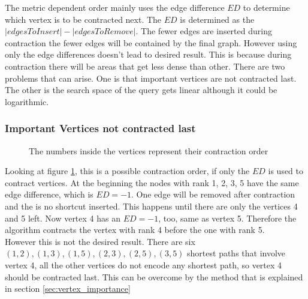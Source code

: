 \documentclass[11pt, rgb]{scrreprt}
\begin{document}
The metric dependent order mainly uses the edge difference $ED$ to determine which vertex is to be contracted next. The $ED$ is determined as the $|edges To Insert| - |edges To Remove|$. The fewer edges are inserted during contraction the fewer edges will be contained by the final graph. However using only the edge differences doesn't lead to desired result. This is because during contraction there will be areas that get less dense than other. There are two problems that can arise. One is that important vertices are not contracted last. The other is the search space of the query gets linear although it could be logarithmic.

\subsubsection{Important Vertices not contracted last}\label{sec:not_contracted_last}

\begin{figure}
    \centering
{} 
    \caption{The numbers inside the vertices represent their contraction order}
    \label{fig:not_contracted_last}
\end{figure}

Looking at figure \ref{fig:not_contracted_last}, this is a possible contraction order, if only the $ED$ is used to contract vertices. At the beginning the nodes with rank 1, 2, 3, 5 have the same edge difference, which is $ED = -1$. One edge will be removed after contraction and the is no shortcut inserted. This happens until there are only the vertices 4 and 5 left. Now vertex 4 has an $ED=-1$, too, same as vertex 5. Therefore the algorithm contracts the vertex with rank 4 before the one with rank 5. \\
However this is not the desired result. There are six ${(1,2), (1,3), (1,5), (2,3), (2,5), (3,5)}$ shortest paths that involve vertex 4, all the other vertices do not encode any shortest path, so vertex 4 should be contracted last. This can be overcome by the method that is explained in section \ref{sec:vertex_importance}
\end{document}
